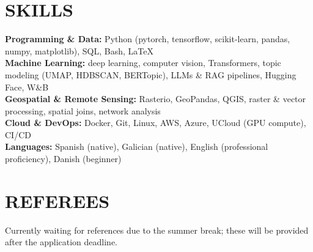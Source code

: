 \documentclass{resume}
\begin{document}
\section{SKILLS}
\begin{content}
    {\bf Programming \& Data:} Python {\footnotesize (pytorch, tensorflow, scikit-learn, pandas, numpy, matplotlib)}, SQL, Bash, \LaTeX \\
    {\bf Machine Learning:} deep learning, computer vision, Transformers, topic modeling {\footnotesize (UMAP, HDBSCAN, BERTopic)}, LLMs \& RAG pipelines, Hugging Face, W\&B \\
    {\bf Geospatial \& Remote Sensing:} Rasterio, GeoPandas, QGIS, raster \& vector processing, spatial joins, network analysis \\
    {\bf Cloud \& DevOps:} Docker, Git, Linux, AWS, Azure, UCloud {\footnotesize (GPU compute)}, CI/CD \\
    {\bf Languages:} Spanish {\footnotesize (native)}, Galician {\footnotesize (native)}, English {\footnotesize (professional proficiency)}, Danish {\footnotesize (beginner)}
\end{content}

\section{REFEREES}
\begin{content}
    {\small Currently waiting for references due to the summer break; these will be provided after the application deadline.} \\
\end{content}
\end{document}
